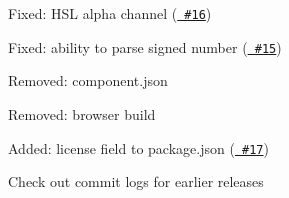 
\begin{DoxyItemize}
\item Fixed\+: HSL alpha channel (\href{https://github.com/harthur/color-string/pull/16}{\texttt{ \#16}})
\item Fixed\+: ability to parse signed number (\href{https://github.com/harthur/color-string/pull/15}{\texttt{ \#15}})
\item Removed\+: component.\+json
\item Removed\+: browser build
\item Added\+: license field to package.\+json (\href{https://github.com/harthur/color-string/pull/17}{\texttt{ \#17}})
\end{DoxyItemize}



Check out commit logs for earlier releases 
